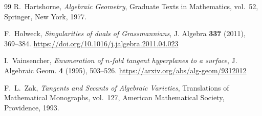 \documentclass[11pt]{article}
\begin{document}
\begin{thebibliography}{99}
R.~Hartshorne,
\emph{Algebraic Geometry},
Graduate Texts in Mathematics, vol.~52, Springer, New York, 1977.

F.~Holweck,
\emph{Singularities of duals of Grassmannians},
J. Algebra \textbf{337} (2011), 369--384.
\url{https://doi.org/10.1016/j.jalgebra.2011.04.023}

I.~Vainsencher,
\emph{Enumeration of $n$-fold tangent hyperplanes to a surface},
J. Algebraic Geom. \textbf{4} (1995), 503--526.
\url{https://arxiv.org/abs/alg-geom/9312012}

F.~L.~Zak,
\emph{Tangents and Secants of Algebraic Varieties},
Translations of Mathematical Monographs, vol.~127,
American Mathematical Society, Providence, 1993.

\end{thebibliography}
\end{document}
